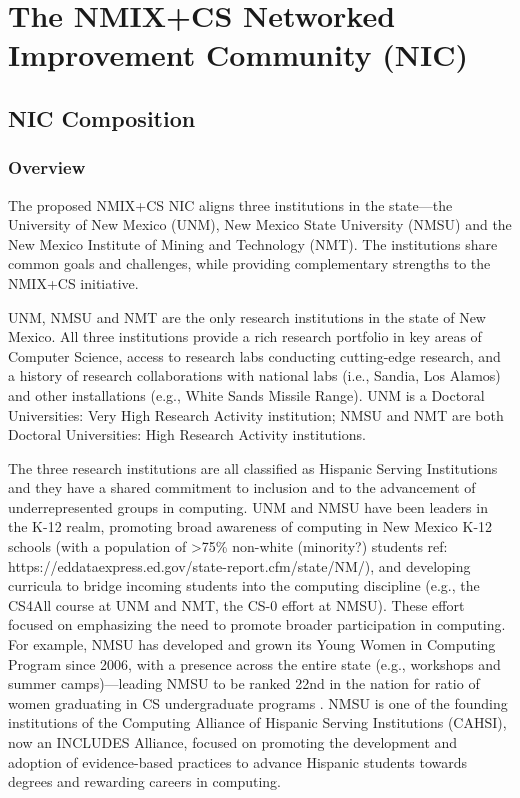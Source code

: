 \section{The NMIX+CS Networked Improvement Community (NIC)}
\label{sec:consortium}

\subsection{NIC Composition}

\subsubsection{Overview}
The proposed NMIX+CS NIC aligns  three  institutions in the state---the University of New Mexico (UNM), New Mexico State University (NMSU) and the New Mexico Institute of Mining and Technology (NMT). The institutions share common goals and challenges, while providing complementary strengths to the NMIX+CS initiative. 

UNM, NMSU and NMT are the only research institutions in the state of New Mexico. All three institutions provide a rich research portfolio in key areas of Computer Science, access to research labs conducting cutting-edge research, and a history of research collaborations with national labs (i.e., Sandia, Los Alamos) and other installations (e.g., White Sands Missile Range). UNM is a 
Doctoral Universities: Very High Research Activity institution;
NMSU and NMT are both Doctoral Universities: High Research Activity institutions. 

The three research institutions are all classified as Hispanic Serving Institutions and they have a shared commitment to inclusion and to the advancement of underrepresented groups in computing. UNM and NMSU have been leaders in the K-12 realm, promoting broad awareness of computing in New Mexico K-12 schools (with a population of >75\% non-white (minority?) students ref: https://eddataexpress.ed.gov/state-report.cfm/state/NM/), and developing curricula to bridge incoming students into the computing discipline (e.g., the CS4All course at UNM and NMT, the CS-0 effort at NMSU). These effort focused on emphasizing the need to promote broader participation in computing. For example, NMSU has developed and grown its Young Women in Computing Program since 2006, with a presence across the entire state (e.g., workshops and summer camps)---leading NMSU to be ranked 22nd in the nation for ratio of women graduating in CS  undergraduate programs \cite{https://www.chronicle.com/article/Which-Colleges-Are-Best-and/245758}. NMSU is one of the founding institutions of the Computing Alliance of Hispanic Serving Institutions (CAHSI), now an INCLUDES Alliance, focused on promoting the development and adoption of evidence-based practices to advance Hispanic students towards degrees and rewarding careers in computing. 

